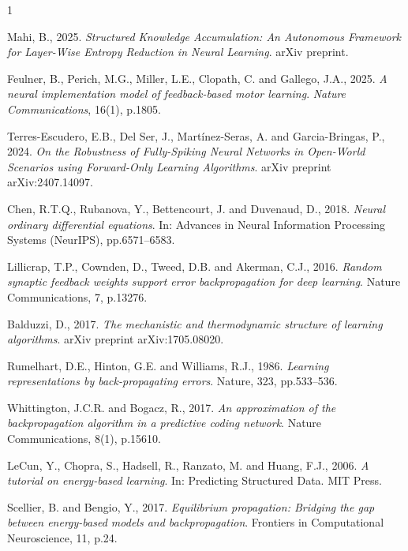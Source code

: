 \documentclass{article}
\begin{document}
 \begin{thebibliography}{1}

Mahi, B., 2025. \textit{Structured Knowledge Accumulation: An Autonomous Framework for Layer-Wise Entropy Reduction in Neural Learning}. arXiv preprint.

Feulner, B., Perich, M.G., Miller, L.E., Clopath, C. and Gallego, J.A., 2025. \textit{A neural implementation model of feedback-based motor learning}. \textit{Nature Communications}, 16(1), p.1805.

Terres-Escudero, E.B., Del Ser, J., Martínez-Seras, A. and Garcia-Bringas, P., 2024. \textit{On the Robustness of Fully-Spiking Neural Networks in Open-World Scenarios using Forward-Only Learning Algorithms}. arXiv preprint arXiv:2407.14097.

Chen, R.T.Q., Rubanova, Y., Bettencourt, J. and Duvenaud, D., 2018. \textit{Neural ordinary differential equations}. In: Advances in Neural Information Processing Systems (NeurIPS), pp.6571--6583.

Lillicrap, T.P., Cownden, D., Tweed, D.B. and Akerman, C.J., 2016. \textit{Random synaptic feedback weights support error backpropagation for deep learning}. Nature Communications, 7, p.13276.

Balduzzi, D., 2017. \textit{The mechanistic and thermodynamic structure of learning algorithms}. arXiv preprint arXiv:1705.08020.

Rumelhart, D.E., Hinton, G.E. and Williams, R.J., 1986. \textit{Learning representations by back-propagating errors}. Nature, 323, pp.533--536.

Whittington, J.C.R. and Bogacz, R., 2017. \textit{An approximation of the backpropagation algorithm in a predictive coding network}. Nature Communications, 8(1), p.15610.

LeCun, Y., Chopra, S., Hadsell, R., Ranzato, M. and Huang, F.J., 2006. \textit{A tutorial on energy-based learning}. In: Predicting Structured Data. MIT Press.

Scellier, B. and Bengio, Y., 2017. \textit{Equilibrium propagation: Bridging the gap between energy-based models and backpropagation}. Frontiers in Computational Neuroscience, 11, p.24.


\end{thebibliography}
\end{document}
